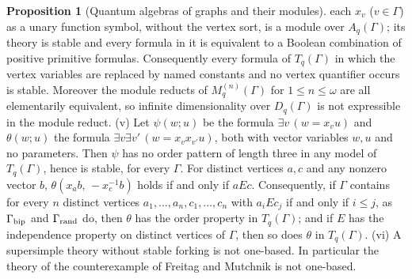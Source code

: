 \documentclass[11pt]{article}
\theoremstyle{definition}
\newtheorem{proposition}{Proposition}
\begin{document}
\begin{proposition}[Quantum algebras of graphs and their modules]
each $x_v$ ($v\in\Gamma$) as a unary function symbol, without the vertex
sort, is a module over $A_q(\Gamma)$; its theory is stable and every
formula in it is equivalent to a Boolean combination of positive primitive
formulas.  Consequently every formula of $T_q(\Gamma)$ in which the vertex
variables are replaced by named constants and no vertex quantifier occurs
is stable.  Moreover the module reducts of $M^{(n)}_q(\Gamma)$ for
$1\le n\le\omega$ are all elementarily equivalent, so infinite
dimensionality over $D_q(\Gamma)$ is not expressible in the module reduct.
{\rm(v)} Let $\psi(w;u)$ be the formula $\exists v\,(w=x_vu)$ and
$\theta(w;u)$ the formula $\exists v\exists v'\,(w=x_vx_{v'}u)$, both with
vector variables $w,u$ and no parameters.  Then $\psi$ has no order pattern
of length three in any model of $T_q(\Gamma)$, hence is stable, for every
$\Gamma$.  For distinct vertices $a,c$ and any nonzero vector $b$,
$\theta(x_ab,\,-x_c^{-1}b)$ holds if and only if $aEc$.  Consequently, if
$\Gamma$ contains for every $n$ distinct vertices $a_1,\dots,a_n,c_1,\dots,c_n$
with $a_iEc_j$ if and only if $i\le j$, as $\Gamma_{\rm bip}$ and
$\Gamma_{\rm rand}$ do, then $\theta$ has the order property in
$T_q(\Gamma)$; and if $E$ has the independence property on distinct
vertices of $\Gamma$, then so does $\theta$ in $T_q(\Gamma)$.
{\rm(vi)} A supersimple theory without stable forking is not one-based.  In
particular the theory of the counterexample of Freitag and Mutchnik is not
one-based.
\end{proposition}
\end{document}
